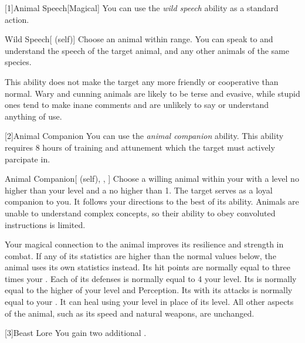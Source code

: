        [1]{Animal Speech}[Magical] You can use the \textit{wild speech} ability as a standard action.
        \begin{attuneability}{Wild Speech}[ (self)]
            Choose an animal within \rnglong range.
            You can speak to and understand the speech of the target animal, and any other animals of the same species.

            This ability does not make the target any more friendly or cooperative than normal.
            Wary and cunning animals are likely to be terse and evasive, while stupid ones tend to make inane comments and are unlikely to say or understand anything of use.
        \end{attuneability}

        [2]{Animal Companion}
        You can use the \textit{animal companion} ability.
        This ability requires 8 hours of training and attunement which the target must actively parcipate in.
        \begin{attuneability}{Animal Companion}[ (self), , ]
            Choose a willing animal within your  with a level no higher than your level and a  no higher than 1.
            The target serves as a loyal companion to you.
            It follows your directions to the best of its ability.
            Animals are unable to understand complex concepts, so their ability to obey convoluted instructions is limited.

            Your magical connection to the animal improves its resilience and strength in combat.
            If any of its statistics are higher than the normal values below, the animal uses its own statistics instead.
            Its hit points are normally equal to three times your .
            Each of its defenses is normally equal to 4 \add your level.
            Its  is normally equal to the higher of your level and Perception.
            Its  with its attacks is normally equal to your .
            It can heal  using your level in place of its level.
            All other aspects of the animal, such as its speed and natural weapons, are unchanged.
        \end{attuneability}

        [3]{Beast Lore} You gain two additional .

